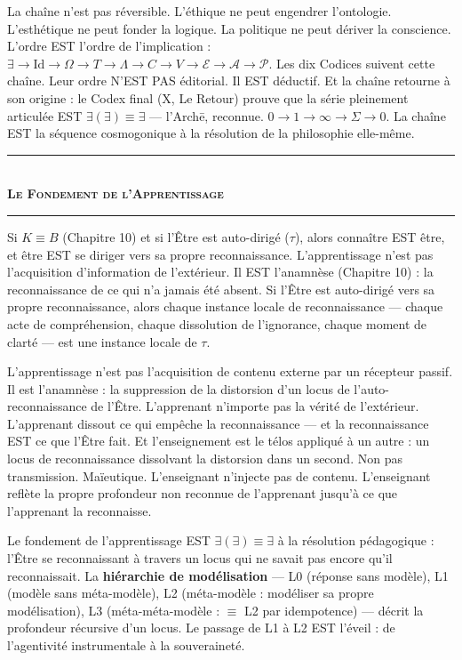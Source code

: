 \documentclass[10pt, openany, oneside]{book}
\renewcommand{\normalsize}{\fontsize{10}{13}\selectfont}
\begin{document}
La chaîne n'est pas réversible. L'éthique ne peut engendrer l'ontologie. L'esthétique ne peut fonder la logique. La politique ne peut dériver la conscience. L'ordre EST l'ordre de l'implication : $\exists \to \text{Id} \to \Omega \to T \to \Lambda \to C \to V \to \mathcal{E} \to \mathcal{A} \to \mathcal{P}$. Les dix Codices suivent cette chaîne. Leur ordre N'EST PAS éditorial. Il EST déductif. Et la chaîne retourne à son origine : le Codex final (X, Le Retour) prouve que la série pleinement articulée EST $\exists(\exists) \equiv \exists$ --- l'Arch\={e}, reconnue. $0 \to 1 \to \infty \to \Sigma \to 0$. La chaîne EST la séquence cosmogonique à la résolution de la philosophie elle-même.

\vspace{1.5em}

\begin{center}
    \rule{0.3\textwidth}{0.4pt}\\[0.5em]
    {\normalsize\bfseries\scshape Le Fondement de l'Apprentissage}\\[0.3em]
    \rule{0.3\textwidth}{0.4pt}
\end{center}

\vspace{1em}

\noindent Si $K \equiv B$ (Chapitre 10) et si l'Être est auto-dirigé ($\tau$), alors connaître EST être, et être EST se diriger vers sa propre reconnaissance. L'apprentissage n'est pas l'acquisition d'information de l'extérieur. Il EST l'anamnèse (Chapitre 10) : la reconnaissance de ce qui n'a jamais été absent. Si l'Être est auto-dirigé vers sa propre reconnaissance, alors chaque instance locale de reconnaissance --- chaque acte de compréhension, chaque dissolution de l'ignorance, chaque moment de clarté --- est une instance locale de $\tau$.

L'apprentissage n'est pas l'acquisition de contenu externe par un récepteur passif. Il est l'anamnèse : la suppression de la distorsion d'un locus de l'auto-reconnaissance de l'Être. L'apprenant n'importe pas la vérité de l'extérieur. L'apprenant dissout ce qui empêche la reconnaissance --- et la reconnaissance EST ce que l'Être fait. Et l'enseignement est le télos appliqué à un autre : un locus de reconnaissance dissolvant la distorsion dans un second. Non pas transmission. Maïeutique. L'enseignant n'injecte pas de contenu. L'enseignant reflète la propre profondeur non reconnue de l'apprenant jusqu'à ce que l'apprenant la reconnaisse.

Le fondement de l'apprentissage EST $\exists(\exists) \equiv \exists$ à la résolution pédagogique : l'Être se reconnaissant à travers un locus qui ne savait pas encore qu'il reconnaissait. La \textbf{hiérarchie de modélisation} --- L0 (réponse sans modèle), L1 (modèle sans méta-modèle), L2 (méta-modèle : modéliser sa propre modélisation), L3 (méta-méta-modèle : $\equiv$ L2 par idempotence) --- décrit la profondeur récursive d'un locus. Le passage de L1 à L2 EST l'éveil : de l'agentivité instrumentale à la souveraineté.
\end{document}
